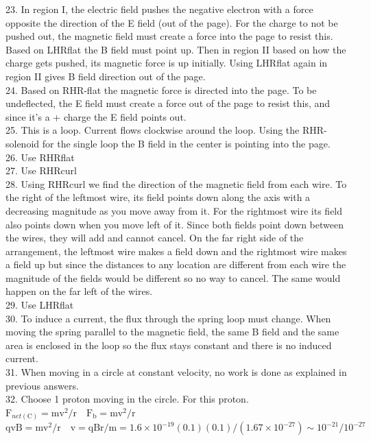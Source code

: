 \begin{enumerate}
23. In region I, the electric field pushes the negative electron with a force opposite the direction of the E field (out of the page). For the charge to not be pushed out, the magnetic field must create a force into the page to resist this. Based on LHRflat the B field must point up. Then in region II based on how the charge gets pushed, its magnetic force is up initially. Using LHRflat again in region II gives B field direction out of the page.\\
24. Based on RHR-flat the magnetic force is directed into the page. To be undeflected, the E field must create a force out of the page to resist this, and since it's a + charge the E field points out.\\
25. This is a loop. Current flows clockwise around the loop. Using the RHR-solenoid for the single loop the B field in the center is pointing into the page.\\
26. Use RHRflat\\
27. Use RHRcurl\\
28. Using RHRcurl we find the direction of the magnetic field from each wire. To the right of the leftmost wire, its field points down along the axis with a decreasing magnitude as you move away from it. For the rightmost wire its field also points down when you move left of it. Since both fields point down between the wires, they will add and cannot cancel. On the far right side of the arrangement, the leftmost wire makes a field down and the rightmost wire makes a field up but since the distances to any location are different from each wire the magnitude of the fields would be different so no way to cancel. The same would happen on the far left of the wires.\\
29. Use LHRflat\\
30. To induce a current, the flux through the spring loop must change. When moving the spring parallel to the magnetic field, the same B field and the same area is enclosed in the loop so the flux stays constant and there is no induced current.\\
31. When moving in a circle at constant velocity, no work is done as explained in previous answers.\\
32. Choose 1 proton moving in the circle. For this proton. $\mathrm{F}_{n e t(\mathrm{C})}=\mathrm{mv}^{2} / \mathrm{r} \quad \mathrm{F}_{\mathrm{b}}=\mathrm{mv}^{2} / \mathrm{r}$ $\mathrm{qvB}=\mathrm{mv}^{2} / \mathrm{r} \quad \mathrm{v}=\mathrm{qBr} / \mathrm{m}=1.6 \times 10^{-19}(0.1)(0.1) /\left(1.67 \times 10^{-27}\right) \sim 10^{-21} / 10^{-27}$\\

\end{enumerate}
